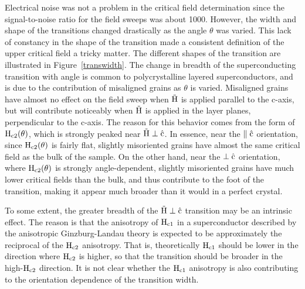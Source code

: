 	Electrical    noise   was  not a problem   in   the  critical field
determination since   the signal-to-noise  ratio for the  field  sweeps was
about   1000.   However, the width  and  shape  of the transitions  changed
drastically as the angle $\theta$  was  varied.  This  lack of constancy in
the  shape  of  the transition made   a consistent definition of  the upper
critical field a tricky matter.  The different shapes of the transition are
illustrated  in Figure~\ref{transwidth}.    The change in  breadth  of  the
superconducting transition with angle  is common to polycrystalline layered
superconductors\cite{prober80},  and   is due    to the   contribution   of
misaligned grains as $\theta$ is varied.  Misaligned  grains have almost no
effect on the field  sweep when $\rm  \vec{H}$  is applied parallel to  the
c-axis, but will contribute noticeably when $\rm \vec{H}$ is applied in the
layer planes, perpendicular  to the c-axis.   The reason for  this behavior
comes from the form of $\rm H_{c2}(\theta)$, which  is strongly peaked near
$\rm \vec{H} \perp \hat{c}$.  In essence, near the $\rm
\parallel \hat{c}$ orientation, since $\rm   H_{c2}(\theta)$ is  fairly  flat, 
slightly misoriented grains have almost the same critical field as the bulk
of the sample.     On  the  other hand,  near   the  $\rm  \perp   \hat{c}$
orientation, where   $\rm    H_{c2}(\theta)$ is  strongly  angle-dependent,
slightly misoriented grains have much lower critical fields  than the bulk,
and  thus contribute to the  foot of the transition, making  it appear much
broader than it would in a perfect crystal.

        To some extent, the greater breadth of the $\rm \vec{H} \perp
\hat{c}$ transition may be an intrinsic effect.  The reason is that the
anisotropy of $\rm H_{c1}$ in a superconductor described by the anisotropic
Ginzburg-Landau theory is  expected to be  approximately the reciprocal  of
the $\rm H_{c2}$  anisotropy.\cite{lawrence71}  That is, theoretically $\rm
H_{c1}$ should be lower in the  direction where $\rm  H_{c2}$ is higher, so
that the transition should be  broader in  the high-$\rm H_{c2}$ direction.
It is not clear whether the $\rm H_{c1}$ anisotropy is also contributing to
the orientation dependence of the transition width.

